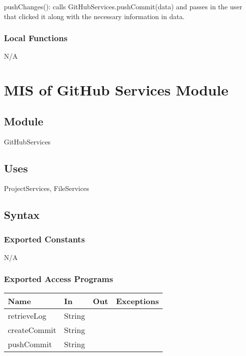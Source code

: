 \documentclass[12pt, titlepage]{article}
\begin{document}
	\noindent pushChanges(): calls GitHubServices.pushCommit(data) and passes in the user that clicked it along with the necessary information in data. \\
	\subsubsection{Local Functions}
	
	N/A
	
	\newpage
	
	\section{MIS of GitHub Services Module} \label{Module} 
	
	\subsection{Module}
	GitHubServices
	
	\subsection{Uses}
	ProjectServices, FileServices
	
	\subsection{Syntax}
	
	\subsubsection{Exported Constants}
	N/A
	
	\subsubsection{Exported Access Programs}
	
	\begin{center}
		\begin{tabular}{l l l l}
			\hline
			\textbf{Name} & \textbf{In} & \textbf{Out} & \textbf{Exceptions} \\
			\hline
			retrieveLog & String & ~ & ~ \\
			\hline
			createCommit & String & ~ & ~ \\
			\hline
			pushCommit & String & ~ & ~ \\
			\hline
		\end{tabular}
	\end{center}
	
\end{document}
